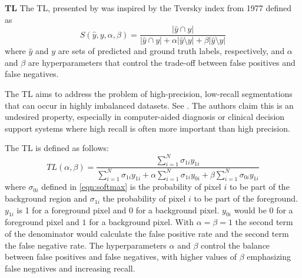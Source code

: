 \textbf{\acf{TL}}\newline
\label{subsubsec:tversky_loss}
\label{subsec:tversky}
The \ac{TL}, presented by \cite{DBLP:journals/corr/SalehiEG17a} was inspired by the Tversky index \cite{tversky1977features} from 1977 defined as
\begin{equation}
    S(\hat{y},y,\alpha,\beta)=\frac{|\hat{y} \cap y|}{|\hat{y} \cap y|+\alpha|\hat{y}\setminus y|+\beta|\hat{y}\setminus y|}
\end{equation}
where $\hat{y}$ and $y$ are sets of predicted and ground truth labels, respectively, and $\alpha$ and $\beta$ are hyperparameters that control the trade-off between false positives and false negatives.

The \ac{TL} aims to address the problem of high-precision, low-recall segmentations that can occur in highly imbalanced datasets. See . The authors claim this is an undesired property, especially in computer-aided diagnosis or clinical decision support systems where high recall is often more important than high precision.

The \ac{TL} is defined as follows:
\begin{equation}
    TL(\alpha,\beta)=\frac{\sum_{i=1}^N \sigma_{1i}y_{1i}}{\sum_{i=1}^N \sigma_{1i}y_{1i}+\alpha\sum_{i=1}^N \sigma_{1i}y_{0i}+\beta\sum_{i=1}^N \sigma_{0i}y_{1i}}
\end{equation}
where $\sigma_{0i}$ defined in \ref{eqn:softmax} is the probability of pixel $i$ to be part of the background region and $\sigma_{1i}$ the probability of pixel $i$ to be part of the foreground. $y_{1i}$ is 1 for a foreground pixel and $0$ for a background pixel. $y_{0i}$ would be 0 for a foreground pixel and $1$ for a background pixel. With $\alpha = \beta = 1$ the second term of the denominator would calculate the false positive rate and the second term the false negative rate. The hyperparameters $\alpha$ and $\beta$ control the balance between false positives and false negatives, with higher values of $\beta$ emphasizing false negatives and increasing recall.

